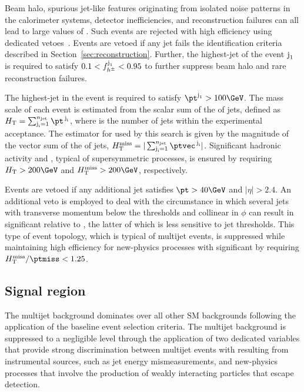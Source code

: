 Beam halo, spurious jet-like features originating from isolated noise
patterns in the calorimeter systems, detector inefficiencies, and
reconstruction failures can all lead to large values of \ptmiss. Such
events are rejected with high efficiency using dedicated
vetoes~\cite{CMS-PAS-JME-16-004, Khachatryan:2014gga}. Events are
vetoed if any jet fails the identification criteria described in
Section~\ref{sec:reconstruction}. Further, the highest-\pt jet of the
event $\text{j}_\text{1}$ is required to satisfy $0.1 < f_{h^{\pm}}^{\text{j}_\text{1}} <
0.95$ to further suppress beam halo and rare reconstruction failures.

The highest-\pt jet in the event is required to satisfy $\pt^{\jet{1}}
> 100\GeV$. The mass scale of each event is estimated from the scalar
sum of the \pt of jets, defined as $\scalht = \sum_{\jet{i} =
  1}^{\njet} \pt^{\,\jet{i}}$, where \njet is the number of jets
within the experimental acceptance. The estimator for \ptvecmiss used
by this search is given by the magnitude of the vector sum of the \pt
of jets, $\mht = |\sum_{\jet{i} = 1}^{\njet}
\ptvec^{\,\jet{i}}|$. Significant hadronic activity and \ptvecmiss,
typical of supersymmetric processes, is ensured by requiring $\scalht
> 200\GeV$ and $\mht > 200\GeV$, respectively.

Events are vetoed if any additional jet satisfies $\pt > 40\GeV$ and
$|\eta| > 2.4$. %
An additional veto is employed to deal with the circumstance in which
several jets with transverse momentum below the \pt thresholds and
collinear in $\phi$ can result in significant \mht relative to
\ptmiss, the latter of which is less sensitive to jet thresholds. This
type of event topology, which is typical of multijet events, is
suppressed while maintaining high efficiency for new-physics processes
with significant \ptvecmiss by requiring $\mhtmet < 1.25$.


\subsection{Signal region}
\label{sec:signal}

The multijet background dominates over all other SM backgrounds
following the application of the baseline event selection
criteria. The multijet background is suppressed to a negligible level
through the application of two dedicated variables that provide strong
discrimination between multijet events with \ptvecmiss resulting from
instrumental sources, such as jet energy mismeasurements, and
new-physics processes that involve the production of weakly
interacting particles that escape detection.

